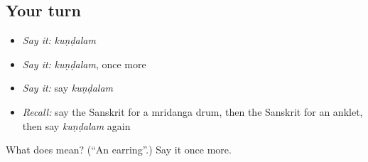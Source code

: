 \subsection*{Your turn}
\begin{itemize}
\raggedright
  \item \emph{Say it:} \emph{kuṇḍalam}
  \item \emph{Say it:} \emph{kuṇḍalam}, once more
  \item \emph{Say it:} say \emph{kuṇḍalam}
  \item \emph{Recall:} say the Sanskrit for a mridanga drum, then the Sanskrit for an anklet, then say \emph{kuṇḍalam} again
\end{itemize}

\begin{tcolorbox}[breakable,colback=teal!4,colframe=teal!35!black,title={Before you move on}]
What does  mean? (\textquotedblleft{}An earring\textquotedblright{}.) Say it once more.
\end{tcolorbox}
